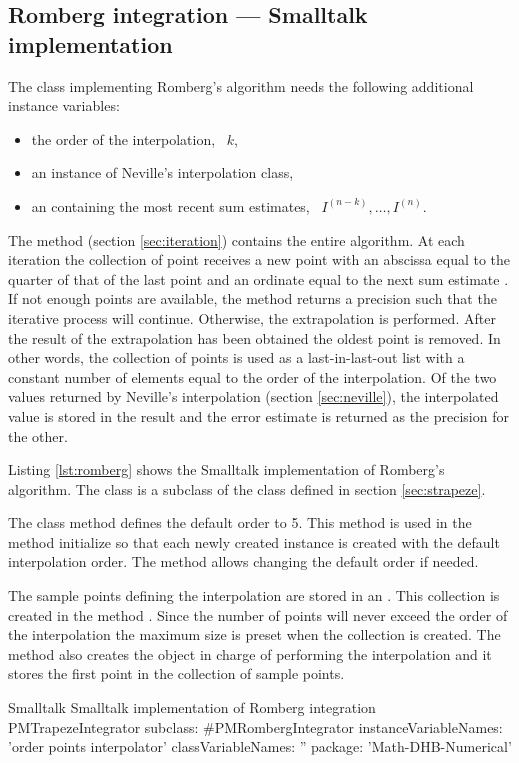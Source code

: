 \subsection{Romberg integration --- Smalltalk implementation}
\label{sec:sromberg}
The class implementing Romberg's algorithm needs the following
additional instance variables:
\begin{itemize}
\item {} the order of the interpolation, \ie\ $k$,\\
\item {} an instance of Neville's interpolation class,\\
\item {} an  containing the most recent sum estimates,
\ie\ $I^{\left(n-k\right)},\ldots,I^{\left(n\right)}$.\\
\end{itemize}
The method  (\cf section \ref{sec:iteration}) contains the entire algorithm. At each iteration the collection of point receives a new point with an
abscissa equal to the quarter of that of the last point and an
ordinate equal to the next sum estimate . If not enough points are
available, the method returns a precision such that the iterative
process will continue. Otherwise, the extrapolation is performed.
After the result of the extrapolation has been obtained the oldest
point is removed. In other words, the collection of points is used
as a last-in-last-out list with a constant number of elements
equal to the order of the interpolation. Of the two values
returned by Neville's interpolation (\cf section \ref{sec:neville}), the interpolated value is stored in the result
and the error estimate is returned as the precision for the other.

Listing \ref{lst:romberg} shows the Smalltalk implementation of Romberg's algorithm. The class  is a subclass of the class  defined in section \ref{sec:strapeze}.

The class method  defines the default order to
5. This method is used in the method initialize so that each newly
created instance is created with the default interpolation order.
The method  allows changing the default order if
needed.

The sample points defining the interpolation are stored in an . This collection is created in the method .
Since the number of points will never exceed the order of the interpolation the maximum size is preset when the collection is created.
The method  also creates the object in charge of performing the interpolation and it stores the first point in the collection of sample points.
\begin{listing}[label=lst:romberg]{Smalltalk}
{Smalltalk implementation of Romberg integration}
PMTrapezeIntegrator subclass: #PMRombergIntegrator
   instanceVariableNames: 'order points interpolator'
   classVariableNames: ''
   package: 'Math-DHB-Numerical'
\end{listing}

